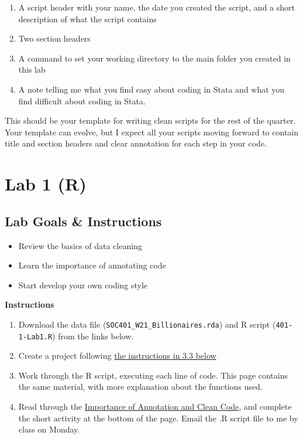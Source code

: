 \documentclass[
]{book}
\providecommand{\tightlist}{%
  \setlength{\itemsep}{0pt}\setlength{\parskip}{0pt}}
\begin{document}
\begin{enumerate}
\def\labelenumi{\arabic{enumi})}
\tightlist
\item
  A script header with your name, the date you created the script, and a short description of what the script contains
\item
  Two section headers
\item
  A command to set your working directory to the main folder you created in this lab
\item
  A note telling me what you find easy about coding in Stata and what you find difficult about coding in Stata.
\end{enumerate}

This should be your template for writing clean scripts for the rest of the quarter. Your template can evolve, but I expect all your scripts moving forward to contain title and section headers and clear annotation for each step in your code.

\hypertarget{lab-1-r}{%
\chapter{Lab 1 (R)}\label{lab-1-r}}

\hypertarget{lab-goals-instructions-1}{%
\section{Lab Goals \& Instructions}\label{lab-goals-instructions-1}}

\begin{itemize}
\tightlist
\item
  Review the basics of data cleaning\\
\item
  Learn the importance of annotating code
\item
  Start develop your own coding style
\end{itemize}

\textbf{Instructions}

\begin{enumerate}
\def\labelenumi{\arabic{enumi}.}
\tightlist
\item
  Download the data file (\texttt{SOC401\_W21\_Billionaires.rda}) and R script (\texttt{401-1-Lab1.R}) from the links below.
\item
  Create a project following \protect\hyperlink{project}{the instructions in 3.3 below}
\item
  Work through the R script, executing each line of code. This page contains the same material, with more explanation about the functions used.
\item
  Read through the \protect\hyperlink{annotate}{Importance of Annotation and Clean Code}, and complete the short activity at the bottom of the page. Email the .R script file to me by class on Monday.
\end{enumerate}
\end{document}

